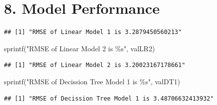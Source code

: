 \documentclass[
]{article}
\newenvironment{Shaded}{\begin{snugshade}}{\end{snugshade}}
\newcommand{\CommentTok}[1]{\textcolor[rgb]{0.56,0.35,0.01}{\textit{#1}}}
\newcommand{\FunctionTok}[1]{\textcolor[rgb]{0.00,0.00,0.00}{#1}}
\newcommand{\NormalTok}[1]{#1}
\newcommand{\OtherTok}[1]{\textcolor[rgb]{0.56,0.35,0.01}{#1}}
\newcommand{\SpecialCharTok}[1]{\textcolor[rgb]{0.00,0.00,0.00}{#1}}
\newcommand{\StringTok}[1]{\textcolor[rgb]{0.31,0.60,0.02}{#1}}
\begin{document}
\hypertarget{model-performance}{%
\section{8. Model Performance}\label{model-performance}}

\begin{Shaded}
\end{Shaded}

\begin{verbatim}
## [1] "RMSE of Linear Model 1 is 3.2879450560213"
\end{verbatim}

\begin{Shaded}
\begin{Highlighting}[]
\FunctionTok{sprintf}\NormalTok{(}\StringTok{"RMSE of Linear Model 2 is \%s"}\NormalTok{, valLR2)}
\end{Highlighting}
\end{Shaded}

\begin{verbatim}
## [1] "RMSE of Linear Model 2 is 3.20023167178661"
\end{verbatim}

\begin{Shaded}
\begin{Highlighting}[]
\FunctionTok{sprintf}\NormalTok{(}\StringTok{"RMSE of Decission Tree Model 1 is \%s"}\NormalTok{, valDT1)}
\end{Highlighting}
\end{Shaded}

\begin{verbatim}
## [1] "RMSE of Decission Tree Model 1 is 3.48706632413932"
\end{verbatim}
\end{document}
